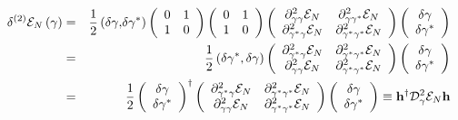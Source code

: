 \documentclass[aps,preprint]{revtex4}
\begin{document}
\begin{eqnarray}
\delta ^{(2)}\mathcal{E}_{N}\left( \mathbf{\gamma }\right) &=&\frac{1}{2}%
\left( \delta \mathbf{\gamma ,}\delta \mathbf{\gamma }^{\ast }\right) \left( 
\begin{array}{cc}
0 & 1 \\ 
1 & 0%
\end{array}%
\right) \left( 
\begin{array}{cc}
0 & 1 \\ 
1 & 0%
\end{array}%
\right) \left( 
\begin{array}{cc}
\mathrm{\partial }_{\gamma \gamma }^{2}\mathcal{E}_{N} & \mathrm{\partial }%
_{\gamma \gamma ^{\ast }}^{2}\mathcal{E}_{N} \\ 
\mathrm{\partial }_{\gamma ^{\ast }\gamma }^{2}\mathcal{E}_{N} & \mathrm{%
\partial }_{\gamma ^{\ast }\gamma ^{\ast }}^{2}\mathcal{E}_{N}%
\end{array}%
\right) \left( 
\begin{array}{c}
\delta \mathbf{\gamma } \\ 
\delta \mathbf{\gamma }^{\ast }%
\end{array}%
\right)  \nonumber \\
&=&\frac{1}{2}\left( \delta \mathbf{\gamma }^{\ast },\delta \mathbf{\gamma }%
\right) \left( 
\begin{array}{cc}
\mathrm{\partial }_{\gamma ^{\ast }\gamma }^{2}\mathcal{E}_{N} & \mathrm{%
\partial }_{\gamma ^{\ast }\gamma ^{\ast }}^{2}\mathcal{E}_{N} \\ 
\mathrm{\partial }_{\gamma \gamma }^{2}\mathcal{E}_{N} & \mathrm{\partial }%
_{\gamma ^{\ast }\gamma ^{\ast }}^{2}\mathcal{E}_{N}%
\end{array}%
\right) \left( 
\begin{array}{c}
\delta \mathbf{\gamma } \\ 
\delta \mathbf{\gamma }^{\ast }%
\end{array}%
\right)  \nonumber \\
&=&\frac{1}{2}\left( 
\begin{array}{c}
\delta \mathbf{\gamma } \\ 
\delta \mathbf{\gamma }^{\ast }%
\end{array}%
\right) ^{\dagger }\left( 
\begin{array}{cc}
\mathrm{\partial }_{\gamma ^{\ast }\gamma }^{2}\mathcal{E}_{N} & \mathrm{%
\partial }_{\gamma ^{\ast }\gamma ^{\ast }}^{2}\mathcal{E}_{N} \\ 
\mathrm{\partial }_{\gamma \gamma }^{2}\mathcal{E}_{N} & \mathrm{\partial }%
_{\gamma ^{\ast }\gamma ^{\ast }}^{2}\mathcal{E}_{N}%
\end{array}%
\right) \left( 
\begin{array}{c}
\delta \mathbf{\gamma } \\ 
\delta \mathbf{\gamma }^{\ast }%
\end{array}%
\right) \equiv \mathbf{h}^{\dagger }\mathcal{D}_{\gamma }^{2}\mathcal{E}_{N}%
\mathbf{h}
\end{eqnarray}%
\end{document}
